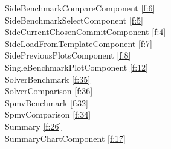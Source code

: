 SideBenchmarkCompareComponent \ref{f:6} \\
SideBenchmarkSelectComponent \ref{f:5} \\
SideCurrentChosenCommitComponent \ref{f:4} \\
SideLoadFromTemplateComponent \ref{f:7} \\
SidePreviousPlotsComponent \ref{f:8} \\
SingleBenchmarkPlotComponent \ref{f:12} \\
SolverBenchmark  \ref{f:35} \\
SolverComparison  \ref{f:36} \\
SpmvBenchmark  \ref{f:32} \\
SpmvComparison  \ref{f:34} \\
Summary \ref{f:26} \\
SummaryChartComponent \ref{f:17} \\

